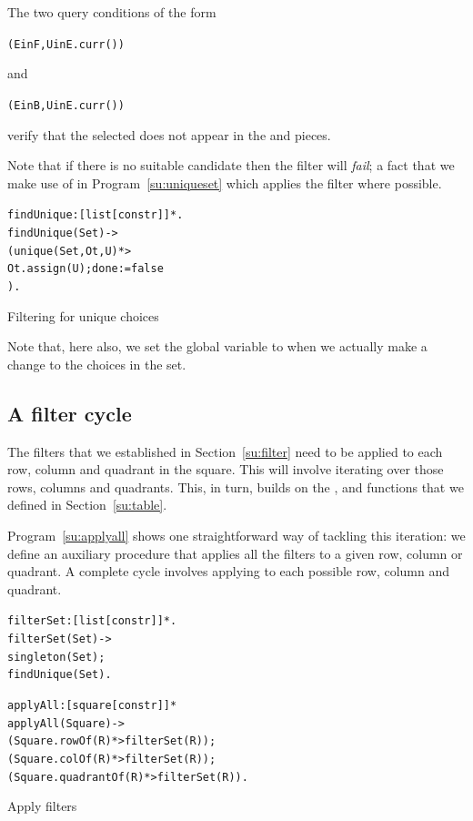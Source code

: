 The two query conditions of the form
\begin{alltt}
\nasf(E in F, U in E.curr())
\end{alltt}
and
\begin{alltt}
\nasf(E in B, U in E.curr())
\end{alltt}
verify that the selected  does not appear in the  and  pieces.

Note that if there is no suitable candidate then the  filter will \emph{fail}; a fact that we make use of in Program~\vref{su:uniqueset} which applies the  filter where possible.
\begin{program}
\vspace{0.5ex}
\begin{alltt}
findUnique:[list[constr]]*.
findUnique(Set) ->
  ( unique(Set,Ot,U) *>
	 Ot.assign(U); done:=false
  ).
\end{alltt}
\vspace{-2ex}
\caption{Filtering for unique choices}
\label{su:uniqueset}
\end{program}
Note that, here also, we set the global  variable to  when we actually make a change to the choices in the set.

\subsection{A filter cycle}
The filters that we established in Section~\vref{su:filter} need to be applied to each row, column and quadrant in the square. This will involve iterating over those rows, columns and quadrants. This, in turn, builds on the ,  and  functions that we defined in Section~\vref{su:table}.

Program~\vref{su:applyall} shows one straightforward way of tackling this iteration: we define an auxiliary procedure  that applies all the filters to a given row, column or quadrant. A complete cycle involves applying  to each possible row, column and quadrant.
\begin{program}
\vspace{0.5ex}
\begin{alltt}
filterSet:[list[constr]]*.
filterSet(Set) ->
	singleton(Set);
	findUnique(Set).

applyAll:[square[constr]]*
applyAll(Square) ->
  ( Square.rowOf(R) *> filterSet(R));
  ( Square.colOf(R) *> filterSet(R));
  ( Square.quadrantOf(R) *> filterSet(R)).
\end{alltt}
\vspace{-2ex}
\caption{Apply filters}
\label{su:applyall}
\end{program}

